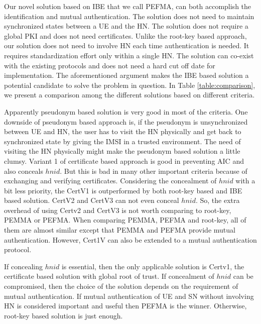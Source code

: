 \documentclass{river-journal}
\begin{document}
Our novel solution based on IBE that we call PEFMA, can both accomplish the identification and mutual authentication. The solution does not need to maintain synchronized states between a UE and the HN. The solution does not require a global PKI and does not need certificates. Unlike the root-key based approach, our solution does not need to involve HN each time authentication is needed. It requires standardization effort only within a single HN. The solution can co-exist with the existing protocols and does not need a hard cut off date for implementation. The aforementioned argument makes the IBE based solution a potential candidate to solve the problem in question. In Table \ref{table:comparison}, we present a comparison among the different solutions based on different criteria.

Apparently pseudonym based solution is very good in most of the criteria. One downside of pseudonym based approach is, if the pseudonym is unsynchronized between UE and HN, the user has to visit the HN physically and get back to synchronized state by giving the IMSI in a trusted environment. The need of visiting the HN physically might make the pseudonym based solution a little clumsy. Variant 1 of certificate based approach is good in preventing AIC and also conceals $hnid$. But this is bad in many other important criteria because of exchanging and verifying certificates. Considering the concealment of $hnid$ with a bit less priority, the CertV1 is outperformed by both root-key based and IBE based solution. CertV2 and CertV3 can not even conceal $hnid$. So, the extra overhead of using Certv2 and CertV3 is not worth comparing to root-key, PEMMA or PEFMA. When comparing PEMMA, PEFMA and root-key, all of them are almost similar except that PEMMA and PEFMA provide mutual authentication. However, Cert1V can also be extended to a mutual authentication protocol. 

If concealing $hnid$ is essential, then the only applicable solution is Certv1, the certificate based solution with global root of trust. If concealment of $hnid$ can be compromised, then the choice  of the solution depends on the requirement of mutual authentication. If mutual authentication of UE and SN without involving HN is considered important and useful then PEFMA is the winner. Otherwise, root-key based solution is just enough.
\end{document}

